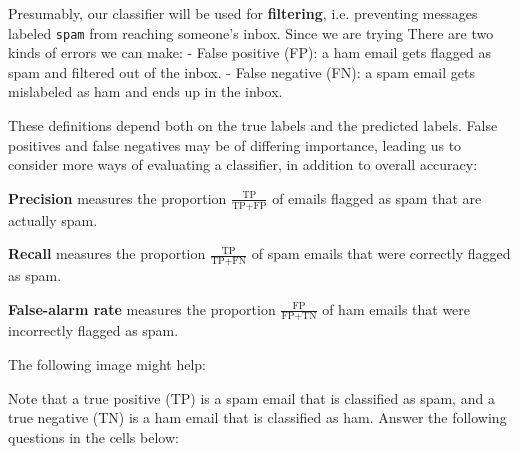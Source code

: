 \documentclass[11pt]{article}
\begin{document}
Presumably, our classifier will be used for \textbf{filtering}, i.e.
preventing messages labeled \texttt{spam} from reaching someone's inbox.
Since we are trying There are two kinds of errors we can make: - False
positive (FP): a ham email gets flagged as spam and filtered out of the
inbox. - False negative (FN): a spam email gets mislabeled as ham and
ends up in the inbox.

These definitions depend both on the true labels and the predicted
labels. False positives and false negatives may be of differing
importance, leading us to consider more ways of evaluating a classifier,
in addition to overall accuracy:

\textbf{Precision} measures the proportion
\(\frac{\text{TP}}{\text{TP} + \text{FP}}\) of emails flagged as spam
that are actually spam.

\textbf{Recall} measures the proportion
\(\frac{\text{TP}}{\text{TP} + \text{FN}}\) of spam emails that were
correctly flagged as spam.

\textbf{False-alarm rate} measures the proportion
\(\frac{\text{FP}}{\text{FP} + \text{TN}}\) of ham emails that were
incorrectly flagged as spam.

The following image might help:

Note that a true positive (TP) is a spam email that is classified as
spam, and a true negative (TN) is a ham email that is classified as ham.
Answer the following questions in the cells below:
\end{document}
